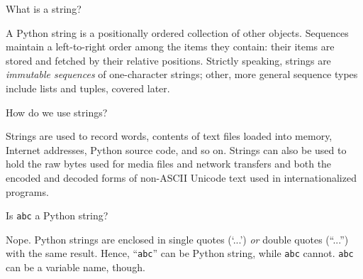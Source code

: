 \documentclass[a4paper,11pt]{book}
\numberwithin{figure}{chapter}
\numberwithin{table}{chapter}
\newcommand{\question}[1]{%
    \begin{tcolorbox}[colback=comp_c!10,colframe=comp_c,sidebyside align=top,width=\linewidth,before skip=1ex]
        #1
    \end{tcolorbox}
    \switchcolumn%
}
\newcommand{\note}[1]{%
    \begin{tcolorbox}[colback=white!0,colframe=white!10,width=\linewidth,before skip=1ex]
        #1
    \end{tcolorbox}
}
\begin{document}
\begin{paracol}{2}
	\question{What is a string?}
	\note{A Python string is a positionally ordered collection of other objects. Sequences maintain a left-to-right order among the items they contain: their items are stored and fetched by their relative positions. Strictly speaking, strings are \textit{immutable sequences} of one-character strings; other, more general sequence types include lists and tuples, covered later.}
\end{paracol}

\begin{paracol}{2}
	\question{How do we use strings?}
	\note{Strings are used to record words, contents of text files loaded into memory, Internet addresses, Python source code, and so on. Strings can also be used to hold the raw bytes used for media files and network transfers and both the encoded and decoded forms of non-ASCII Unicode text used in internationalized programs.}
\end{paracol}

\begin{paracol}{2}
	\question{Is \texttt{abc} a Python string?}
	\note{Nope. Python strings are enclosed in single quotes (`...') \textit{or} double quotes (``...'') with the same result. Hence, ``\texttt{abc}'' can be Python string, while \texttt{abc} cannot. \texttt{abc} can be a variable name, though.}
\end{paracol}
\end{document}
